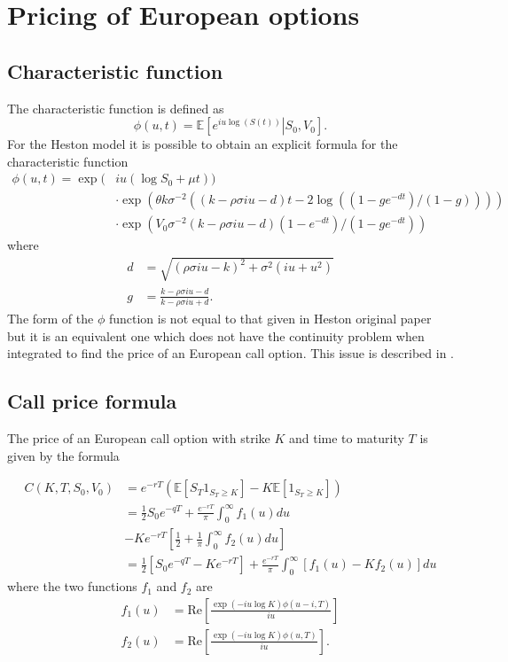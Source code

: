 \section{Pricing of European options}

\subsection{Characteristic function }

The characteristic function is defined as
\begin{equation}
\phi(u,t) = \mathbb{E} \left[\left.e^{iu\log(S(t))}\right|S_0,V_0\right].
\end{equation}
For the Heston model it is possible to obtain an explicit formula for the characteristic function
\begin{align}
\phi(u,t) = \exp( & iu(\log S_0 + \mu t)) \nonumber\\
 & \cdot\exp(\theta k \sigma^{-2}((k-\rho\sigma iu - d)t - 2\log( (1-ge^{-dt})/ (1-g) )))\nonumber\\
 & \cdot\exp(V_0\sigma^{-2}(k-\rho\sigma iu - d)(1-e^{-dt})/(1-ge^{-dt}))
\end{align}
where
\begin{align}
 d & = \sqrt{(\rho\sigma iu - k)^2 + \sigma^2(iu + u^2)} \\
 g & = \frac{k-\rho\sigma iu - d}{k-\rho\sigma iu + d}.
\end{align}
The form of the $\phi$ function is not equal to that given in Heston original paper but it is an equivalent one which does not have the continuity problem when integrated to find the price of an European call option. This issue is described in \cite{Albrecher:HestonTrap}.




\subsection{Call price formula}
\label{call}

The price of an European call option with strike $K$ and time to maturity $T$ is given by the formula

\begin{equation}
\begin{aligned}
C(K,T, S_0, V_0) &= e^{-r T}\left(	\mathbb{E}\left[S_T 1_{S_T \geq K} \right] - K \mathbb{E}\left[1_{S_T \geq K} \right]\right) \\
&=\frac{1}{2}S_0e^{-q T}+ \frac{e^{-r T}}{\pi}\int_0^{\infty}f_1(u) du  \\
&- K e^{-r T}  \left[ \frac{1}{2} + \frac{1}{\pi}\int_0^{\infty}f_2(u) du \right] \\
&=  \frac{1}{2}\left[S_0e^{-q T} - Ke^{-r T}\right] + \frac{e^{-r T}}{\pi}\int_0^{\infty}\left[f_1(u) - Kf_2(u)\right]du
\end{aligned}
\end{equation}
where the two functions $f_1$ and $f_2$ are
\begin{align}
f_1(u) & = \mathrm{Re}\left[\frac{\exp(-iu\log K)\phi(u-i,T)}{iu}\right]\\
f_2(u) & = \mathrm{Re}\left[\frac{\exp(-iu\log K)\phi(u,T)}{iu}\right].
\end{align}

